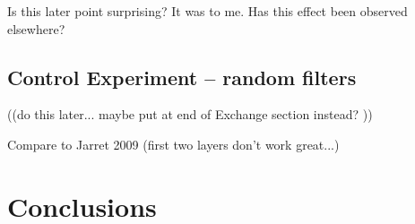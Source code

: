 Is this later point surprising? It was to me. Has this effect been observed elsewhere?











\subsection{Control Experiment -- random filters}

((do this later... maybe put at end of Exchange section instead? ))

Compare to Jarret 2009 (first two layers don't work great...)
\cite{Jarrett-ICCV2009}








\section{Conclusions}

